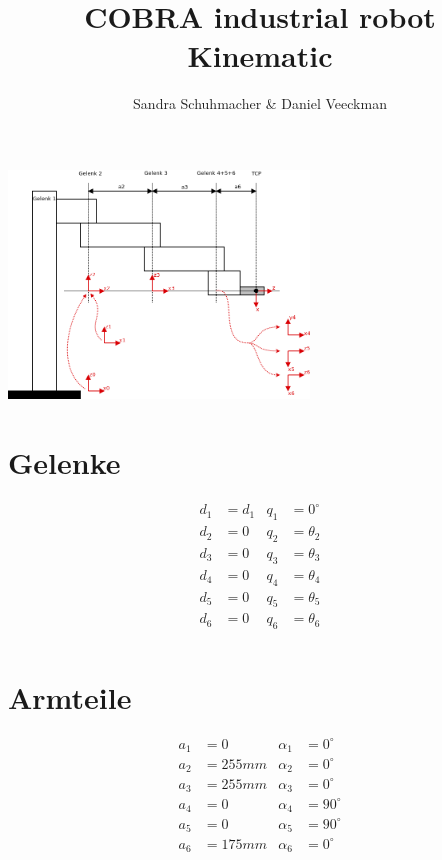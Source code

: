 \documentclass[12pt]{article}
\begin{document}
 
 
\title{COBRA industrial robot Kinematic}%
\author{Sandra Schuhmacher \& Daniel Veeckman} %
 
\maketitle

\includegraphics[width=0.6\textwidth]{Kinematic.png}
 
\section{Gelenke}

\begin{align*}
    d_1 &= d_1 & q_1 &= 0^\circ \\
    d_2 &= 0   & q_2 &= \theta_2 \\
    d_3 &= 0   & q_3 &= \theta_3 \\
    d_4 &= 0   & q_4 &= \theta_4 \\
    d_5 &= 0   & q_5 &= \theta_5 \\
    d_6 &= 0   & q_6 &= \theta_6 \\
\end{align*}
 
\section{Armteile}

\begin{align*}
    a_1 &= 0     & \alpha_1 &= 0^\circ \\
    a_2 &= 255mm & \alpha_2 &= 0^\circ \\
    a_3 &= 255mm & \alpha_3 &= 0^\circ \\
    a_4 &= 0     & \alpha_4 &= 90^\circ \\
    a_5 &= 0     & \alpha_5 &= 90^\circ \\
    a_6 &= 175mm & \alpha_6 &= 0^\circ \\
\end{align*}
 
\end{document}
